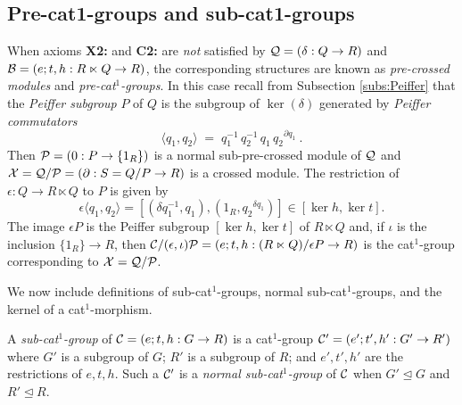 \subsection{Pre-cat1-groups and sub-cat1-groups} \label{subs:precat1}

When axioms \textbf{X2:} and \textbf{C2:} are \emph{not} satisfied
by  $\mathcal{Q} = (\delta : Q \to R)$  and  
$\mathcal{B} = (e;t,h : R \ltimes Q \to R)$,
the corresponding structures are known as \emph{pre-crossed modules}
and \emph{pre-cat$^1$-groups}.
In this case recall from Subsection \ref{subs:Peiffer}
that the \emph{Peiffer subgroup}  $P$  of  $Q$  is the subgroup of
$\ker(\delta)$  generated by \emph{Peiffer commutators}
$$
\langle q_1, q_2 \rangle 
\;=\; 
q_1^{-1}\,q_2^{-1}\,q_1\,{q_2}^{\partial q_1}~.
$$
Then  $\mathcal{P} = (0 : P \to \{1_R\})$  
is a normal sub-pre-crossed module of  $\mathcal{Q}$  and  
$\mathcal{X} = \mathcal{Q}/\mathcal{P} = (\partial : S=Q/P \to R)$  is a crossed module.
The restriction of  $\epsilon : Q \to R \ltimes Q$  to  $P$  is given by
$$
   \epsilon \langle q_1, q_2 \rangle
 = [ (\delta q_1^{-1}, q_1), (1_R, {q_2}^{\delta q_1}) ]
 \in  [ \ker h, \ker t ].
$$
The image  $\epsilon P$  is the Peiffer subgroup
$[\ker h, \ker t]$  of  $R \ltimes Q$
and, if  $\iota$  is the inclusion  $\{ 1_R \} \to R$,  then
$\mathcal{C}/(\epsilon,\iota)\mathcal{P} = 
 (e;t,h : (R \ltimes Q) / \epsilon P \to R)$
is the cat$^1$-group corresponding to  $\mathcal{X} = \mathcal{Q}/\mathcal{P}$.


\bigskip
We now include definitions of sub-cat$^1$-groups, 
normal sub-cat$^1$-groups, and the kernel of a cat$^1$-morphism. 

A \emph{sub-cat$^1$-group} of $\mathcal{C} = (e;t,h : G \to R)$ 
is a cat$^1$-group $\mathcal{C}' = (e';t',h' : G' \to R')$ where 
$G'$ is a subgroup of $G$; $R'$ is a subgroup of $R$; 
and $e',t',h'$ are the restrictions of $e,t,h$. 
Such a $\mathcal{C}'$ is a \emph{normal sub-cat$^1$-group} of $\mathcal{C}$ 
when $G' \unlhd G$ and $R' \unlhd R$. 

